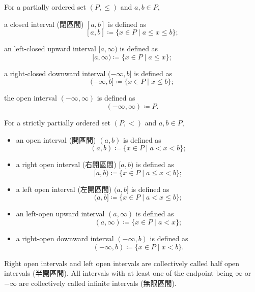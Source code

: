 \documentclass[a4paper,12pt]{article}
\begin{document}
For a partially ordered set $(P,\leq)$ and $a,b\in P$, 
\bit
\item a closed interval (閉區間) $[a,b]$ is defined as
\[[a,b]\coloneq\{x\in P\mid a\leq x\leq b\};\]
\item an left-closed upward interval $[a,\infty)$ is defined as
\[[a,\infty)\coloneq\{x\in P\mid a\leq x\};\]
\item a right-closed downward interval $(-\infty,b]$ is defined as
\[(-\infty,b]\coloneq\{x\in P\mid x\leq b\};\]
\item the open interval $(-\infty,\infty)$ is defined as
\[(-\infty,\infty)\coloneq P.\]
\eit

For a strictly partially ordered set $(P,<)$ and $a,b\in P$,
\begin{itemize}
\item an open interval (開區間) $(a,b)$ is defined as
\[(a,b)\coloneq\{x\in P\mid a<x<b\};\]
\item a right open interval (右開區間) $[a,b)$ is defined as
\[[a,b)\coloneq\{x\in P\mid a\leq x<b\};\]
\item a left open interval (左開區間) $(a,b]$ is defined as
\[(a,b]\coloneq\{x\in P\mid a<x\leq b\};\]
\item an left-open upward interval $(a,\infty)$ is defined as
\[(a,\infty)\coloneq\{x\in P\mid a<x\};\]
\item a right-open downward interval $(-\infty,b)$ is defined as
\[(-\infty,b)\coloneq\{x\in P\mid x<b\}.\]
\end{itemize}

Right open intervals and left open intervals are collectively called half open intervals (半開區間). All intervals with at least one of the endpoint being $\infty$ or $-\infty$ are collectively called infinite intervals (無限區間).
\end{document}
